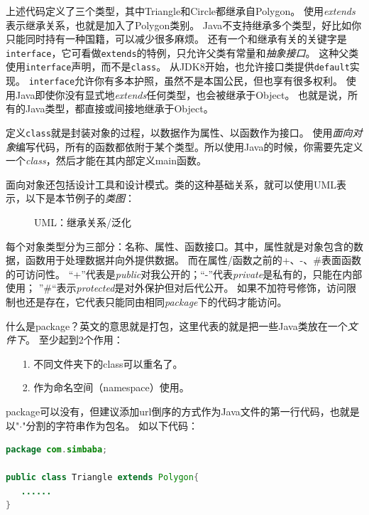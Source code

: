 上述代码定义了三个类型，其中Triangle和Circle都继承自Polygon。
使用\emph{extends}表示继承关系，也就是加入了Polygon类别。
Java不支持继承多个类型，好比如你只能同时持有一种国籍，可以减少很多麻烦。
还有一个和继承有关的关键字是\lstinline{interface}，它可看做\lstinline{extends}的特例，只允许父类有常量和\emph{抽象接口}。
这种父类使用\lstinline{interface}声明，而不是\lstinline{class}。
从JDK8开始，也允许接口类提供\lstinline{default}实现。
\lstinline{interface}允许你有多本护照，虽然不是本国公民，但也享有很多权利。
使用Java即使你没有显式地\emph{extends}任何类型，也会被继承于Object。
也就是说，所有的Java类型，都直接或间接地继承于Object。

定义\lstinline{class}就是封装对象的过程，以数据作为属性、以函数作为接口。
使用\emph{面向对象}编写代码，所有的函数都依附于某个类型。所以使用Java的时候，你需要先定义一个\emph{class}，然后才能在其内部定义main函数。

面向对象还包括设计工具和设计模式。类的这种基础关系，就可以使用UML表示，以下是本节例子的\emph{类图}：
\begin{figure}[!htb]
\begin{center}
\end{center}
\caption{UML：继承关系/泛化}
\label{table:part1_oo_uml_extends}
\end{figure}

每个对象类型分为三部分：名称、属性、函数接口。其中，属性就是对象包含的数据，函数用于处理数据并向外提供数据。
而在属性/函数之前的+、-、\#表面函数的可访问性。
“+”代表是\emph{public}对我公开的；“-”代表\emph{private}是私有的，只能在内部使用；
”\#“表示\emph{protected}是对外保护但对后代公开。
如果不加符号修饰，访问限制也还是存在，它代表只能同由相同\emph{package}下的代码才能访问。

什么是package？英文的意思就是打包，这里代表的就是把一些Java类放在一个\emph{文件下}。
至少起到2个作用：
\begin{itemize}
\item[1.] 不同文件夹下的class可以重名了。
\item[2.] 作为命名空间（namespace）使用。
\end{itemize}
\noindent
package可以没有，但建议添加url倒序的方式作为Java文件的第一行代码，也就是以"\emph{$\cdot$}"分割的字符串作为包名。
如以下代码：
\begin{lstlisting}[language=Java]
package com.simbaba;

public class Triangle extends Polygon{
   ......
}
\end{lstlisting}

